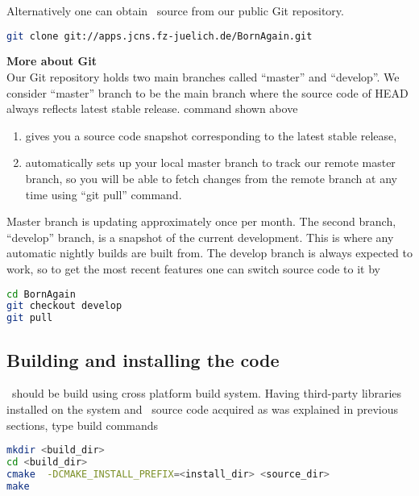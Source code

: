 \noindent
Alternatively one can obtain \BornAgain\ source from our public Git repository.
\begin{lstlisting}[language=bash, style=commandline]
git clone git://apps.jcns.fz-juelich.de/BornAgain.git 
\end{lstlisting}
\vspace*{3mm}


\noindent
{\bf\large More about Git} \\
Our Git repository holds two main branches called ``master'' and ``develop''. We consider ``master''
branch to be the main branch where the source code of HEAD always reflects latest stable release.  command shown above
\begin{enumerate}[1.]
\item gives you a source code snapshot corresponding to the latest stable release,
\item automatically sets up your local master branch to track our remote master branch, 
so you will be able to fetch changes from the remote branch at any time using ``git pull'' command.
\end{enumerate}

Master branch is updating approximately once per month.
The second branch, ``develop'' branch, is a snapshot of the current development.
This is where any automatic nightly builds are built from. The develop branch is
always expected to work, so to get the most recent features one can switch source code to it by
\begin{lstlisting}[language=bash, style=commandline]
cd BornAgain
git checkout develop
git pull
\end{lstlisting}
\vspace*{3mm}



\subsection{Building and installing the code}

\BornAgain\ should be build using  cross platform build system. 
Having third-party libraries installed on the system and \BornAgain\ source code acquired as was explained in
previous sections, type build commands
\begin{lstlisting}[language=bash, style=commandline]
mkdir <build_dir>
cd <build_dir>
cmake  -DCMAKE_INSTALL_PREFIX=<install_dir> <source_dir>
make
\end{lstlisting}
\vspace*{3mm}

